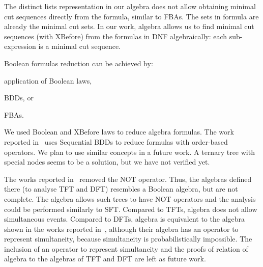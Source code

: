 %
%
%
%

The distinct lists representation in our algebra does not allow obtaining minimal cut sequences directly from the formula, similar to \acp{FBA}.
The sets in  formula are already the minimal cut sets.
In our work, \ac{algebra} allows us to find minimal cut sequences (with \ac{XBefore}) from the formulas in \ac{DNF} algebraically: each sub-expression is a minimal cut sequence.

Boolean formulas reduction can be achieved by: 
\begin{alineasinline}
  \item application of Boolean laws, 
  \item \acp{BDD}, or 
  \item \acp{FBA}.
\end{alineasinline}
%
We used Boolean and \ac{XBefore} laws to reduce \ac{algebra} formulas.
%
The work reported in~\cite{TXD2011,XTD2012} uses Sequential BDDs to reduce formulas with order-based operators.
%
We plan to use similar concepts in a future work.
A ternary tree with special nodes seems to be a solution, but we have not verified yet.

The works reported in~\cite{Merle2010,MRL+2010,MRL2011,Walker2009,WP2009} removed the \ac{NOT} operator.
Thus, the algebras defined there (to analyse \ac{TFT} and \ac{DFT}) resembles a Boolean algebra, but are not complete. 
The \ac{algebra} allows such trees to have \ac{NOT} operators and the analysis could be performed similarly to \ac{SFT}.
Compared to \acp{TFT}, \ac{algebra} does not allow simultaneous events.
Compared to \acp{DFT}, \ac{algebra} is equivalent to the algebra shown in the works reported in~\cite{MRL2011b,Merle2010}, although their algebra has an operator to represent simultaneity, because simultaneity is probabilistically impossible.
The inclusion of an operator to represent simultaneity and the proofs of relation of \ac{algebra} to the algebras of \ac{TFT} and \ac{DFT} are left as future work.

